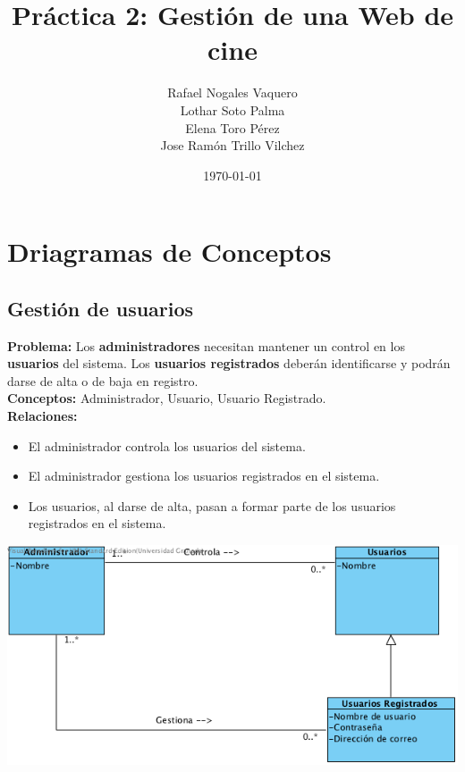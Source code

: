 \documentclass{article}
\title{Práctica 2: Gestión de una Web de cine}
\author{Rafael Nogales Vaquero
\\Lothar Soto Palma
\\Elena Toro Pérez
\\Jose Ramón Trillo Vilchez}
\date{\today}
\begin{document}
\maketitle

\section{Driagramas de Conceptos}
	\subsection*{Gestión de usuarios}
		\textbf{Problema:} Los \textbf{administradores} necesitan mantener un control en los \textbf{usuarios} del sistema.
Los \textbf{usuarios registrados} deberán identificarse y podrán darse de alta o de baja en registro.\\
\textbf{Conceptos:} Administrador, Usuario, Usuario Registrado.\\
\textbf{	Relaciones:}
	\begin{itemize}
    	\item El administrador controla los usuarios del sistema.
        \item El administrador gestiona los usuarios registrados en el sistema.
        \item Los usuarios, al darse de alta, pasan a formar parte de los usuarios registrados en el sistema.      	
    \end{itemize}
	\includegraphics[width=1\linewidth]{./C-Usuarios}


\end{document}
